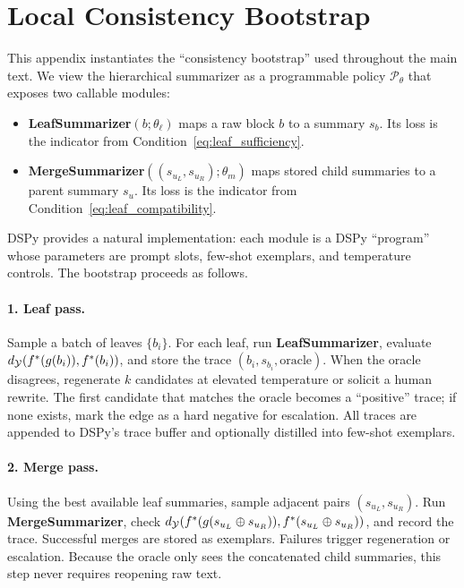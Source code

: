 \section{Local Consistency Bootstrap}\label{app:bootstrap}

This appendix instantiates the ``consistency bootstrap'' used throughout the main text. We view the hierarchical summarizer as a programmable policy $\mathcal{P}_\theta$ that exposes two callable modules:
\begin{itemize}
    \item \textbf{LeafSummarizer}$(b;\theta_\ell)$ maps a raw block $b$ to a summary $s_b$. Its loss is the indicator from Condition~\eqref{eq:leaf_sufficiency}.
    \item \textbf{MergeSummarizer}$((s_{u_L},s_{u_R});\theta_m)$ maps stored child summaries to a parent summary $s_u$. Its loss is the indicator from Condition~\eqref{eq:leaf_compatibility}.
\end{itemize}
DSPy \citep{khattab2024dspy} provides a natural implementation: each module is a DSPy ``program'' whose parameters are prompt slots, few-shot exemplars, and temperature controls. The bootstrap proceeds as follows.

\paragraph{1. Leaf pass.} Sample a batch of leaves $\{b_i\}$. For each leaf, run \textbf{LeafSummarizer}, evaluate $d_{\mathcal{Y}}(f^{\ast}(g(b_i)),f^{\ast}(b_i))$, and store the trace $(b_i, s_{b_i}, \text{oracle})$. When the oracle disagrees, regenerate $k$ candidates at elevated temperature or solicit a human rewrite. The first candidate that matches the oracle becomes a ``positive'' trace; if none exists, mark the edge as a hard negative for escalation. All traces are appended to DSPy's trace buffer and optionally distilled into few-shot exemplars.

\paragraph{2. Merge pass.} Using the best available leaf summaries, sample adjacent pairs $(s_{u_L},s_{u_R})$. Run \textbf{MergeSummarizer}, check $d_{\mathcal{Y}}(f^{\ast}(g(s_{u_L}\oplus s_{u_R})),f^{\ast}(s_{u_L}\oplus s_{u_R}))$, and record the trace. Successful merges are stored as exemplars. Failures trigger regeneration or escalation. Because the oracle only sees the concatenated child summaries, this step never requires reopening raw text.

